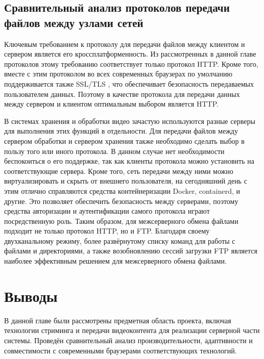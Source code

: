 \subsection{Сравнительный анализ протоколов передачи файлов между узлами сетей}	
	Ключевым требованием к протоколу для передачи файлов между клиентом и сервером является его кроссплатформенность. Из рассмотренных в данной главе протоколов этому требованию соответствует только протокол HTTP. Кроме того, вместе с этим протоколом во всех современных браузерах по умолчанию поддерживается также SSL/TLS \cite{rfcHttp10}, что обеспечивает безопасность передаваемых пользователем данных. Поэтому в качестве протокола для передачи данных между сервером и клиентом оптимальным выбором является HTTP.
	
	В системах хранения и обработки видео зачастую используются разные серверы для выполнения этих функций в отдельности. Для передачи файлов между сервером обработки и сервером хранения также необходимо сделать выбор в пользу того или иного протокола. В данном случае нет необходимости беспокоиться о его поддержке, так как клиенты протокола можно установить на соответствующие сервера. Кроме того, сеть передачи между ними можно виртуализировать и скрыть от внешнего пользователя, на сегодняшний день с этим отлично справляются средства контейнеризации Docker, containerd, и другие. Это позволяет обеспечить безопасность между серверами, поэтому средства авторизации и аутентификации самого протокола играют посредственную роль. Таким образом, для межсерверного обмена файлами подходит не только протокол HTTP, но и FTP. Благодаря своему двухканальному режиму, более развёрнутому списку команд для работы с файлами и директориями, а также возобновлению сессий загрузки FTP является наиболее эффективным решением для межсерверного обмена файлами.

\section{Выводы}
	В данной главе были рассмотрены предметная область проекта, включая технологии стриминга  и передачи видеоконтента для реализации серверной части системы. Проведён сравнительный анализ производительности, адаптивности и совместимости с современными браузерами соответствующих технологий.

